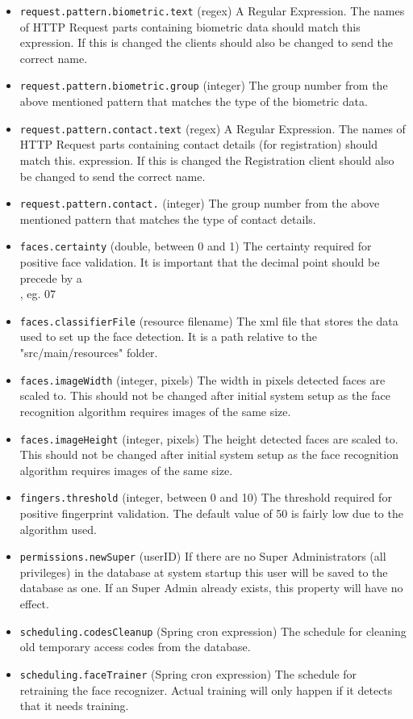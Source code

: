 \begin{itemize}
\item \verb!request.pattern.biometric.text! (regex) A Regular Expression. The names of HTTP Request parts containing biometric data should match this expression. If this is changed the clients should also be changed to send the correct name.
\item \verb!request.pattern.biometric.group! (integer) The group number from the above mentioned pattern that matches the type of the biometric data.
\item \verb!request.pattern.contact.text! (regex) A Regular Expression. The names of HTTP Request parts containing contact details (for registration) should match this. expression. If this is changed the Registration client should also be changed to send the correct name.
\item \verb!request.pattern.contact.! (integer) The group number from the above mentioned pattern that matches the type of contact details.

\item \verb!faces.certainty! (double, between 0 and 1) The certainty required for positive face validation. It is important that the decimal point should be precede by a \\, eg. 0\.7 
\item \verb!faces.classifierFile! (resource filename) The xml file that stores the data used to set up the face detection. It is a path relative to the "src/main/resources" folder. 
\item \verb!faces.imageWidth! (integer, pixels) The width in pixels detected faces are scaled to. This should not be changed after initial system setup as the face recognition algorithm requires images of the same size.
\item \verb!faces.imageHeight! (integer, pixels) The height detected faces are scaled to. This should not be changed after initial system setup as the face recognition algorithm requires images of the same size.

\item \verb!fingers.threshold! (integer, between 0 and 10) The threshold required for positive fingerprint validation. The default value of 50 is fairly low due to the algorithm used.
\item \verb!permissions.newSuper! (userID) If there are no Super Administrators (all privileges) in the database at system startup this user will be saved to the database as one. If an Super Admin already exists, this property will have no effect. 

\item \verb!scheduling.codesCleanup! (Spring cron expression) The schedule for cleaning old temporary access codes from the database.
\item \verb!scheduling.faceTrainer! (Spring cron expression) The schedule for retraining the face recognizer. Actual training will only happen if it detects that it needs training. 

\end{itemize}
